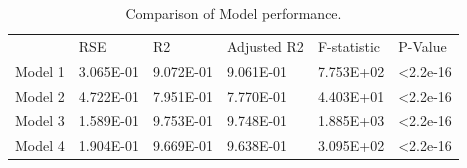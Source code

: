 \documentclass[review,12pt,authoryear]{elsarticle}
\begin{document}
\begin{linenumbers}
\begin{table}[]
\caption{Comparison of Model performance.}
\label{tab:tab 11}
\begin{tabular}{llllll}
        & RSE       & R2        & Adjusted 			R2 & F-statistic & P-Value           \\
Model 1 & 3.065E-01 & 9.072E-01 & 9.061E-01      & 7.753E+02   & \textless 2.2e-16 \\
Model 2 & 4.722E-01 & 7.951E-01 & 7.770E-01      & 4.403E+01   & \textless 2.2e-16 \\
Model 3 & 1.589E-01 & 9.753E-01 & 9.748E-01      & 1.885E+03   & \textless 2.2e-16 \\
Model 4 & 1.904E-01 & 9.669E-01 & 9.638E-01      & 3.095E+02   & \textless 2.2e-16
\end{tabular}
\end{table}

%



\end{linenumbers}
  
\end{document}
